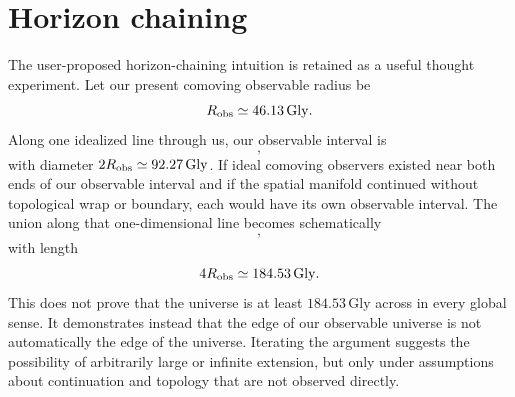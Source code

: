 \documentclass[11pt,a4paper]{article}
\newcommand{\Gly}{\,\mathrm{Gly}}
\begin{document}
\section{Horizon chaining}
The user-proposed horizon-chaining intuition is retained as a useful thought experiment. Let our present comoving observable radius be
\begin{equation}
    R_{\rm obs}\simeq 46.13\Gly.
\end{equation}
Along one idealized line through us, our observable interval is
\begin{equation}
    [-R_{\rm obs}, +R_{\rm obs}],
\end{equation}
with diameter $2R_{\rm obs}\simeq92.27\Gly$. If ideal comoving observers existed near both ends of our observable interval and if the spatial manifold continued without topological wrap or boundary, each would have its own observable interval. The union along that one-dimensional line becomes schematically
\begin{equation}
    [-2R_{\rm obs}, +2R_{\rm obs}],
\end{equation}
with length
\begin{equation}
    4R_{\rm obs}\simeq184.53\Gly.
\end{equation}
This does not prove that the universe is at least $184.53\Gly$ across in every global sense. It demonstrates instead that the edge of our observable universe is not automatically the edge of the universe. Iterating the argument suggests the possibility of arbitrarily large or infinite extension, but only under assumptions about continuation and topology that are not observed directly.
\end{document}
